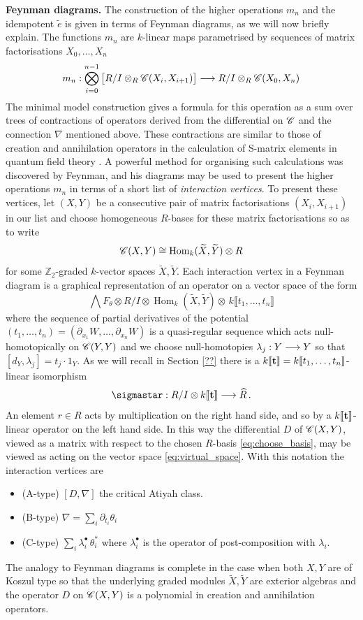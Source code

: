 \documentclass[english,letter paper,12pt,leqno]{article}
\theoremstyle{example}
\numberwithin{equation}{section}
\def\Hom{\operatorname{Hom}}
\def\be{\begin{equation}}
\def\ee{\end{equation}}
\def\nZ{\mathds{Z}}
\begin{document}
\textbf{Feynman diagrams.} The construction of the higher operations $m_n$ and the idempotent $\widetilde{e}$ is given in terms of Feynman diagrams, as we will now briefly explain. The functions $m_n$ are $k$-linear maps parametrised by sequences of matrix factorisations $X_0,\ldots,X_n$
\[
m_n: \bigotimes_{i=0}^{n-1}\big[ R/I \otimes_R \mathscr{C}(X_i,X_{i+1}) \big] \longrightarrow R/I \otimes_R \mathscr{C}(X_0,X_n)
\]
The minimal model construction gives a formula for this operation as a sum over trees of contractions of operators derived from the differential on $\mathscr{C}$ and the connection $\nabla$ mentioned above. These contractions are similar to those of creation and annihilation operators in the calculation of S-matrix elements in quantum field theory \cite{??}. A powerful method for organising such calculations was discovered by Feynman, and his diagrams may be used to present the higher operations $m_n$ in terms of a short list of \emph{interaction vertices}. To present these vertices, let $(X,Y)$ be a consecutive pair of matrix factorisations $(X_i, X_{i+1})$ in our list and choose homogeneous $R$-bases for these matrix factorisations so as to write
\be\label{eq:choose_basis}
\md{C}( X, Y ) \cong \Hom_k( \widetilde{X}, \widetilde{Y} ) \otimes R
\ee
for some $\nZ_2$-graded $k$-vector spaces $\widetilde{X},\widetilde{Y}$. Each interaction vertex in a Feynman diagram is a graphical representation of an operator on a vector space of the form
\be\label{eq:virtual_space}
\bigwedge F_\theta \otimes R/I \otimes \Hom_k( \widetilde{X}, \widetilde{Y} )  \otimes \, k\llbracket t_1,\ldots,t_n \rrbracket
\ee
where the sequence of partial derivatives of the potential $(t_1,\ldots,t_n) = (\partial_{x_1} W,\ldots,\partial_{x_n} W)$ is a quasi-regular sequence which acts null-homotopically on $\mathscr{C}(Y,Y)$ and we choose null-homotopies $\lambda_j: Y \longrightarrow Y$ so that $[d_{Y}, \lambda_j] = t_j \cdot 1_{Y}$. As we will recall in Section \ref{??} there is a $k\llbracket \bold{t} \rrbracket = k\llbracket t_1,\ldots,t_n \rrbracket$-linear isomorphism
\[
\sigmastar: R/I \otimes k \llbracket \bold{t} \rrbracket \lto \widehat{R}\,.
\]
An element $r \in R$ acts by multiplication on the right hand side, and so by a $k\llbracket \bold{t} \rrbracket$-linear operator on the left hand side. In this way the differential $D$ of $\mathscr{C}(X,Y)$, viewed as a matrix with respect to the chosen $R$-basis \eqref{eq:choose_basis}, may be viewed as acting on the vector space \eqref{eq:virtual_space}. With this notation the interaction vertices are
\begin{itemize}
\item (A-type) $[ D, \nabla ]$ the critical Atiyah class.
\item (B-type) $\nabla = \sum_i \partial_{t_i} \theta_i$
\item (C-type) $\sum_i \lambda_i^\bullet\, \theta_i^*$ where $\lambda^\bullet_i$ is the operator of post-composition with $\lambda_i$.
\end{itemize}
The analogy to Feynman diagrams is complete in the case when both $X,Y$ are of Koszul type \cite{??} so that the underlying graded modules $\widetilde{X}, \widetilde{Y}$ are exterior algebras and the operator $D$ on $\mathscr{C}(X,Y)$ is a polynomial in creation and annihilation operators.
\\
\end{document}
